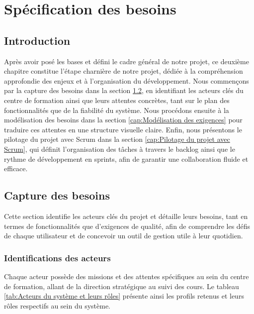 \chapter{Spécification des besoins} 
 \minitoc
 \newpage
 \section{Introduction}
 Après avoir posé les bases et défini le cadre général de notre projet, ce deuxième chapitre constitue l'étape charnière de notre projet, dédiée à la compréhension approfondie des enjeux et à l'organisation du développement. Nous commençons par la capture des besoins dans la section \ref{cap:Capture des besoins}, en identifiant les acteurs clés du centre de formation ainsi que leurs attentes concrètes, tant sur le plan des fonctionnalités que de la fiabilité du système. Nous procédons ensuite à la modélisation des besoins dans la section \ref{cap:Modélisation des exigences} pour traduire ces attentes en une structure visuelle claire. Enfin, nous présentons le pilotage du projet avec Scrum dans la section \ref{cap:Pilotage du projet avec Scrum}, qui définit l’organisation des tâches à travers le backlog ainsi que le rythme de développement en sprints, afin de garantir une collaboration fluide et efficace.

\section{Capture des besoins}
\label{cap:Capture des besoins}
Cette section identifie les acteurs clés du projet et détaille leurs besoins, tant en termes de fonctionnalités que d'exigences de qualité, afin de comprendre les défis de chaque utilisateur et de concevoir un outil de gestion utile à leur quotidien.


\subsection{Identifications des acteurs}
Chaque acteur possède des missions et des attentes spécifiques au sein du centre de formation, allant de la direction stratégique au suivi des cours. Le tableau \ref{tab:Acteurs du système et leurs rôles} présente ainsi les profils retenus et leurs rôles respectifs au sein du système.

